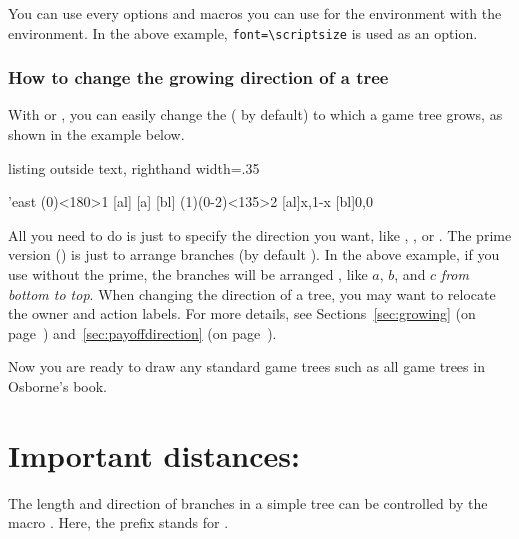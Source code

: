 You can use every options and macros you can use for the  environment with the  environment. In the above example, \verb+font=\scriptsize+ is used as an option.

\subsubsection{How to change the growing direction of a tree}

With \cmd{\setistgrowdirection} or , you can easily change the  ( by default) to which a game tree grows, as shown in the example below.

\begin{tcblisting}{listing outside text, righthand width=.35\linewidth}
\begin{istgame}[scale=1.2]
\setistgrowdirection'{east}
\istroot(0)<180>{1} 
  [al]
  [a]
  [bl]
  \endist
\xtdistance{10mm}{20mm}
\istroot(1)(0-2)<135>{2}
  [al]{x,1-x}
  [bl]{0,0}
  \endist
\end{istgame}
\end{tcblisting}

All you need to do is just to specify the direction you want, like , , or . The prime version () is just to arrange branches  (by default ). In the above example, if you use \cmd{\setistgrowdirection} without the prime, the branches will be arranged , like $a$, $b$, and $c$ \emph{from bottom to top}.
When changing the direction of a tree, you may want to relocate the owner and action labels.
For more details, see Sections~\ref{sec:growing} (on page~\pageref{sec:growing}) and~\ref{sec:payoffdirection} (on page~\pageref{sec:payoffdirection}).

Now you are ready to draw any standard game trees such as all game trees in Osborne's book.


\section{Important distances: \protect\cmd{\xtdistance}}

\label{sec:xtdistance}

The length and direction of branches in a simple tree can be controlled by the macro \icmd{\xtdistance}. 
Here, the prefix  stands for .

